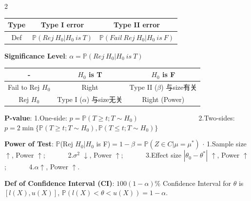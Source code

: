 \documentclass[9pt]{article}
\begin{document}
\vspace{-0.4cm}
\begin{multicols}{2}
    \begin{tabular}{|c|c|c|}
        \hline
        Type & Type I error                         & Type II error                               \\
        \hline
        Def  & $\mathbb{P}(Rej \ H_0|H_0 \ is \ T)$ & $\mathbb{P}(Fail \ Rej \ H_0|H_0 \ is \ F)$ \\
        \hline
    \end{tabular}

    \textbf{Significance Level}: $\alpha = \mathbb{P}(Rej \ H_0|H_0 \ is \ T)$

    \columnbreak

    \begin{tabular}{|c|c|c|}
        \hline
        -                 & $H_0$ is T                                 & $H_0$ is F                                \\
        \hline
        Fail to Rej $H_0$ & Right                                      & {\footnotesize Type II ($\beta$) 与size有关} \\
        \hline
        Rej $H_0$         & {\footnotesize Type I ($\alpha $) 与size无关} & Right (Power)                             \\
        \hline
    \end{tabular}

\end{multicols}
\vspace{-0.4cm}

\textbf{P-value}: 1.One-side: $p=\mathbb{P}(T\geq t;T\sim H_0)$ \ \ \ \ \ \ \ \ \ \ \ \ \ \ \ \ \ 2.Two-sides: $p=2\min\{\mathbb{P}(T\geq t;T\sim H_0),\mathbb{P}(T\leq t;T\sim H_0)\}$

\textbf{Power of Test}: $\mathbb{P}$(Rej $H_0$|$H_0$ is F)$=1-\beta=\mathbb{P}(Z\in C|\mu=\mu^*)$ {\scriptsize $\cdot$ 1.Sample size $\uparrow$, Power $\uparrow$; \ \ \ \ \ \ 2.$\sigma^2$ $\downarrow$, Power $\uparrow$; \ \ \ \ \ \ 3.Effect size $|\theta_0-\theta^*|$ $\uparrow$, Power $\uparrow$; \ \ \ \ \ \ 4.$\alpha$$\uparrow$, Power $\uparrow$.}

\textbf{Def of Confidence Interval (CI)}: $100(1-\alpha)\%$ Confidence Interval for $\theta$ is $[l(X),u(X)]$, $\mathbb{P}(l(X)<\theta<u(X))=1-\alpha.$
\end{document}

